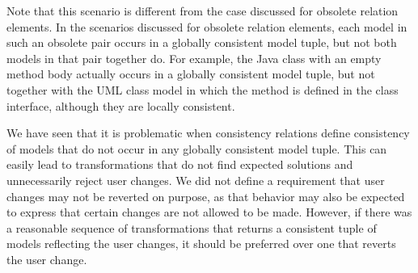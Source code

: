 Note that this scenario is different from the case discussed for obsolete relation elements.
In the scenarios discussed for obsolete relation elements, each model in such an obsolete pair occurs in a globally consistent model tuple, but not both models in that pair together do.
For example, the Java class with an empty method body actually occurs in a globally consistent model tuple, but not together with the UML class model in which the method is defined in the class interface, although they are locally consistent.

We have seen that it is problematic when consistency relations define consistency of models that do not occur in any globally consistent model tuple.
This can easily lead to transformations that do not find expected solutions and unnecessarily reject user changes.
We did not define a requirement that user changes may not be reverted on purpose, as that behavior may also be expected to express that certain changes are not allowed to be made.
However, if there was a reasonable sequence of transformations that returns a consistent tuple of models reflecting the user changes, it should be preferred over one that reverts the user change.




